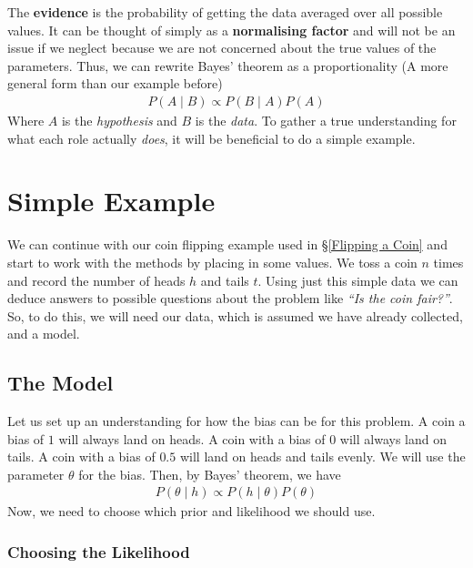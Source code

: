 \documentclass[12pt,twoside]{report}   %
\begin{document}
The \textbf{evidence} is the probability of getting the data averaged over all possible values. It can be thought of simply as a \textbf{normalising factor} and will not be an issue if we neglect because we are not concerned about the true values of the parameters. Thus, we can rewrite Bayes' theorem as a proportionality (A more general form than our example before)
\begin{align}\label{Bayes' Formula Proportional}
P(A\mid B) \propto P(B\mid A)P(A)
\end{align}
Where $A$ is the \textit{hypothesis} and $B$ is the \textit{data}. To gather a true understanding for what each role actually \textit{does}, it will be beneficial to do a simple example.

\section{Simple Example}\label{Flip of a Coin}

We can continue with our coin flipping example used in \S\ref{Flipping a Coin} and start to work with the methods by placing in some values. We toss a coin $n$ times and record the number of heads $h$ and tails $t$. Using just this simple data we can deduce answers to possible questions about the problem like \textit{``Is the coin fair?''}. So, to do this, we will need our data, which is assumed we have already collected, and a model. 

\subsection{The Model}\label{The Model}

Let us set up an understanding for how the bias can be for this problem. A coin a bias of $1$ will always land on heads. A coin with a bias of $0$ will always land on tails. A coin with a bias of $0.5$ will land on heads and tails evenly. We will use the parameter $\theta$ for the bias. Then, by Bayes' theorem, we have
\begin{align}\label{Bayes' Theorem Proportional Coin}
P(\theta\mid h) \propto P(h\mid \theta)P(\theta)
\end{align}
Now, we need to choose which prior and likelihood we should use.

\subsubsection{Choosing the Likelihood}\label{Choosing the Likelihood}
\end{document}
